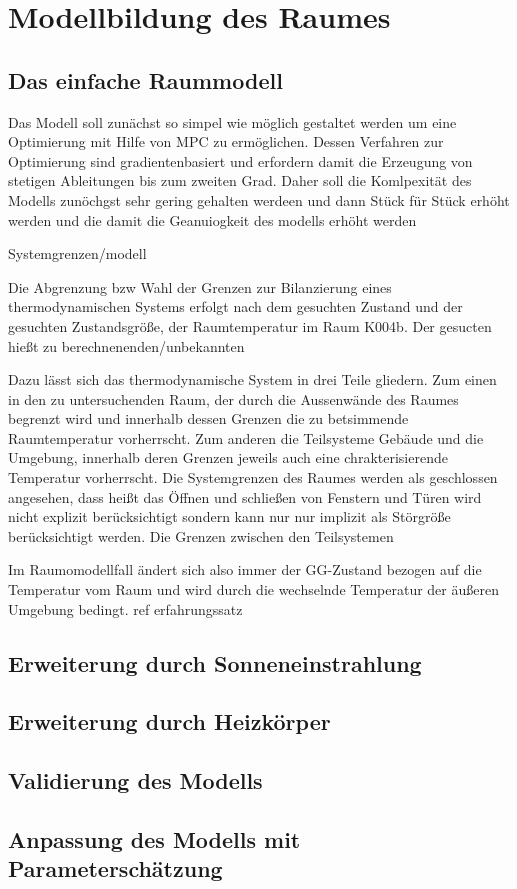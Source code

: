 %
%

\chapter{Modellbildung des Raumes}
\label{chap:modellbildung}

\renewcommand{\chapterheadstartvskip}{\vspace*{-0.5cm}}

\section{Das einfache Raummodell}

Das Modell soll zunächst so simpel wie möglich gestaltet werden um eine Optimierung mit Hilfe von MPC zu ermöglichen. Dessen Verfahren zur Optimierung sind gradientenbasiert und erfordern damit die Erzeugung von stetigen Ableitungen bis zum zweiten Grad. Daher soll die Komlpexität des Modells zunöchgst sehr gering gehalten werdeen und dann Stück für Stück erhöht werden und die damit die Geanuiogkeit des modells erhöht werden

Systemgrenzen/modell


Die Abgrenzung bzw Wahl der Grenzen zur Bilanzierung eines thermodynamischen Systems erfolgt nach dem gesuchten Zustand und der gesuchten Zustandsgröße, der Raumtemperatur im Raum K004b. Der gesucten hießt zu berechnenenden/unbekannten

Dazu lässt sich das thermodynamische System in drei Teile gliedern. Zum einen in den zu untersuchenden Raum, der durch die Aussenwände des Raumes begrenzt wird und innerhalb dessen Grenzen die zu betsimmende Raumtemperatur vorherrscht. Zum anderen die Teilsysteme Gebäude und die Umgebung, innerhalb deren Grenzen jeweils auch eine chrakterisierende Temperatur vorherrscht. Die Systemgrenzen des Raumes werden als geschlossen angesehen, dass heißt das Öffnen und schließen von Fenstern und Türen wird nicht explizit berücksichtigt sondern kann nur nur implizit als Störgröße berücksichtigt werden. Die Grenzen zwischen den Teilsystemen 

Im Raumomodellfall ändert sich also immer der GG-Zustand bezogen auf die Temperatur vom Raum und wird durch die wechselnde Temperatur der äußeren Umgebung bedingt.
ref erfahrungssatz


\section{Erweiterung durch Sonneneinstrahlung}


\section{Erweiterung durch Heizkörper}

\section{Validierung des Modells}

\section{Anpassung des Modells mit Parameterschätzung}